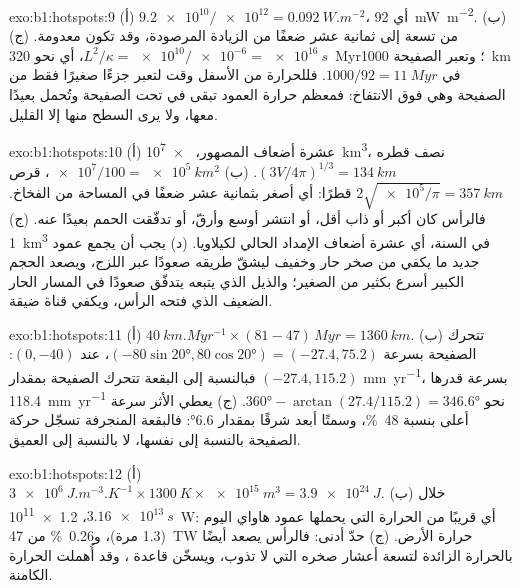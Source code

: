 \begin{solution}{exo:b1:hotspots:9}
(أ) $\num{9.2e10}/\num{e12} = \qty{0.092}{W.m^{-2}}$، أي \qty{92}{mW.m^{-2}}. (ب) من تسعة إلى ثمانية عشر ضعفًا من الزيادة المرصودة، وقد تكون معدومة. (ج) $L^2/\kappa =
\num{e10}/\num{e-6} = \qty{e16}{s}$، أي نحو \qty{320}{Myr}؛ وتعبر الصفيحة \qty{1000}{km} في $1000/92 = \qty{11}{Myr}$. فللحرارة من الأسفل وقت لتعبر جزءًا صغيرًا فقط من الصفيحة وهي فوق الانتفاخ: فمعظم حرارة العمود تبقى في  تحت الصفيحة وتُحمل بعيدًا معها، ولا يرى السطح منها إلا القليل.
\end{solution}

\begin{solution}{exo:b1:hotspots:10}
(أ) عشرة أضعاف المصهور، \qty{e7}{km^3}، نصف قطره
$(3V/4\pi)^{1/3} = \qty{134}{km}$. (ب) $\num{e7}/100 = \qty{e5}{km^2}$، قرص
$2\sqrt{\num{e5}/\pi} = \qty{357}{km}$ قطرًا: أي أصغر بثمانية عشر ضعفًا في المساحة من الفخاخ. فالرأس كان أكبر أو ذاب أقل، أو انتشر أوسع وأرقّ، أو تدفّقت الحمم بعيدًا عنه. (ج) \qty{1}{km^3} في السنة، أي عشرة أضعاف الإمداد الحالي لكيلاويا. (د) يجب أن يجمع عمود جديد ما يكفي من صخر حار وخفيف ليشقّ طريقه صعودًا عبر  اللزج، ويصعد الحجم الكبير أسرع بكثير من الصغير؛ والذيل الذي يتبعه يتدفّق صعودًا في المسار الحار الضعيف الذي فتحه الرأس، ويكفي قناة ضيقة.
\end{solution}

\begin{solution}{exo:b1:hotspots:11}
(أ) $\qty{40}{km.Myr^{-1}}\times(81 - 47)\,\unit{Myr} = \qty{1360}{km}$. (ب) تتحرك الصفيحة بسرعة $(-80\sin\ang{20}, 80\cos\ang{20}) = (-27.4, 75.2)$،  عند $(0, -40)$: فبالنسبة إلى البقعة تتحرك الصفيحة بمقدار $(-27.4, 115.2)$ \unit{mm.yr^{-1}}، بسرعة قدرها \qty{118.4}{mm.yr^{-1}} نحو $\ang{360} - \arctan(27.4/115.2) = \ang{346.6}$. (ج) يعطي الأثر سرعة أعلى بنسبة \qty{48}{\percent}، وسمتًا أبعد شرقًا بمقدار \ang{6.6}: فالبقعة المنجرفة تسجّل حركة الصفيحة بالنسبة إلى نفسها، لا بالنسبة إلى  العميق.
\end{solution}

\begin{solution}{exo:b1:hotspots:12}
(أ) $\qty{3e6}{J.m^{-3}.K^{-1}}\times\qty{1300}{K}\times\qty{e15}{m^3} =
\qty{3.9e24}{J}$. (ب) خلال $\qty{3.16e13}{s}$، \qty{1.2e11}{W}: أي قريبًا من الحرارة التي يحملها عمود هاواي اليوم (1.3 مرة)، و\qty{0.26}{\percent} من \qty{47}{TW} حرارة الأرض. (ج) حدّ أدنى: فالرأس يصعد أيضًا بالحرارة الزائدة لتسعة أعشار صخره التي لا تذوب، ويسخّن قاعدة ، وقد أُهملت الحرارة الكامنة.
\end{solution}

